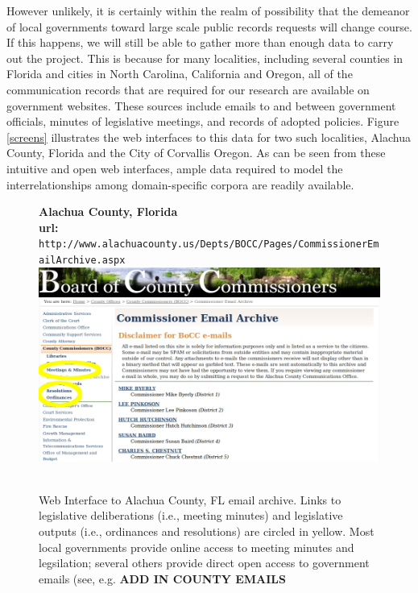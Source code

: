  However unlikely, it is certainly within the realm of possibility that the demeanor of local governments toward large scale public records requests will change course. If this happens, we will still be able to gather more than enough data to carry out the project. This is because for many localities, including several counties in Florida and cities in North Carolina, California and Oregon, all of the communication records that are required for our research are available on government websites. These sources include emails to and between government officials, minutes of legislative meetings, and records of adopted policies. Figure \ref{screens} illustrates the web interfaces to this data for two such localities, Alachua County, Florida and the City of Corvallis Oregon. As can be seen from these intuitive and open web interfaces, ample data required to model the interrelationships among domain-specific corpora are readily available.

\begin{figure}[h]
\begin{center}
{\bf Alachua County, Florida} \\
 {\bf url:} \texttt{http://www.alachuacounty.us/Depts/BOCC/Pages/CommissionerEmailArchive.aspx} \\
 \includegraphics[scale=.45]{AlachuaBOCC.jpg} \\~\\
\end{center}
\caption{Web Interface to Alachua County, FL email archive. Links to legislative deliberations (i.e., meeting minutes) and legislative outputs (i.e., ordinances and resolutions) are circled in yellow. Most local governments provide online access to meeting minutes and legsilation; several others provide direct open access to government emails (see, e.g. {\bf ADD IN COUNTY EMAILS} }
\end{figure}

